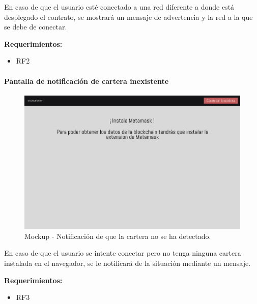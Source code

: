 En caso de que el usuario esté conectado a una red diferente a donde está desplegado el contrato, se mostrará un mensaje de advertencia y la red a la que se debe de conectar.

\bigskip

\textbf{Requerimientos: }
\begin{itemize}
    \item RF2
\end{itemize}

\paragraph{Pantalla de notificación de cartera inexistente}
\begin{figure}[H]
        \centering
        \includegraphics[width=1\textwidth]{img/mockups/cartera_inexistente_mockup.png}
        \caption{Mockup - Notificación de que la cartera no se ha detectado.}
        \label{fig:configApi}
\end{figure}

En caso de que el usuario se intente conectar pero no tenga ninguna cartera instalada en el navegador, se le notificará de la situación mediante un mensaje.

\bigskip

\textbf{Requerimientos: }
\begin{itemize}
    \item RF3
\end{itemize}

